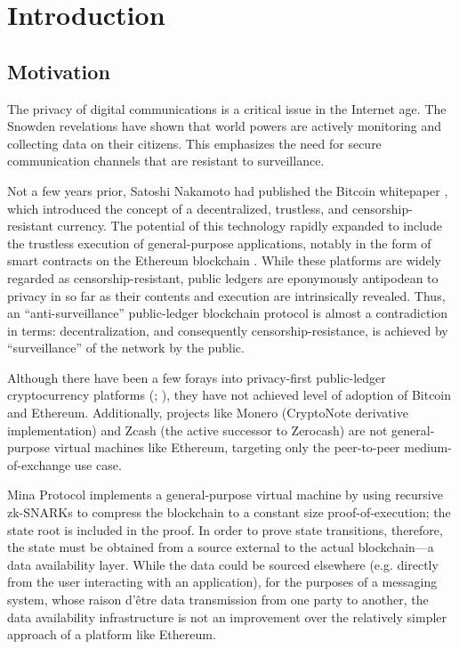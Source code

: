 \chapter{Introduction}

\label{Introduction}

\section{Motivation}\label{motivation}

The privacy of digital communications is a critical issue in the Internet age. The Snowden revelations \parencite{greenwald_nsa_2013} have shown that world powers are actively monitoring and collecting data on their citizens. This emphasizes the need for secure communication channels that are resistant to surveillance.

Not a few years prior, Satoshi Nakamoto had published the Bitcoin whitepaper \parencite{nakamoto_bitcoin_2008}, which introduced the concept of a decentralized, trustless, and censorship-resistant currency. The potential of this technology rapidly expanded to include the trustless execution of general-purpose applications, notably in the form of smart contracts on the Ethereum blockchain \parencite{buterin_ethereum_2014}. While these platforms are widely regarded as censorship-resistant, public ledgers are eponymously antipodean to privacy in so far as their contents and execution are intrinsically revealed. Thus, an ``anti-surveillance'' public-ledger blockchain protocol is almost a contradiction in terms: decentralization, and consequently censorship-resistance, is achieved by ``surveillance'' of the network by the public.

Although there have been a few forays into privacy-first public-ledger cryptocurrency platforms (\cite[CryptoNote:][]{saberhagen_cryptonote_2013}; \cite[Zerocash:][]{sasson_zerocash_2014}), they have not achieved level of adoption of Bitcoin and Ethereum. Additionally, projects like Monero (CryptoNote derivative implementation) and Zcash (the active successor to Zerocash) are not general-purpose virtual machines like Ethereum, targeting only the peer-to-peer medium-of-exchange use case.

Mina Protocol \parencite{bonneau_mina_2020} implements a general-purpose virtual machine by using recursive zk-SNARKs to compress the blockchain to a constant size proof-of-execution; the state root is included in the proof. In order to prove state transitions, therefore, the state must be obtained from a source external to the actual blockchain---a data availability layer. While the data could be sourced elsewhere (e.g. directly from the user interacting with an application), for the purposes of a messaging system, whose raison d'\^{e}tre data transmission from one party to another, the data availability infrastructure is not an improvement over the relatively simpler approach of a platform like Ethereum.

